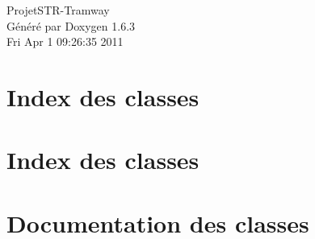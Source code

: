 \documentclass[a4paper]{book}
\begin{document}
\hypersetup{pageanchor=false}
\begin{titlepage}
\vspace*{7cm}
\begin{center}
{\Large ProjetSTR-\/Tramway }\\
\vspace*{1cm}
{\large Généré par Doxygen 1.6.3}\\
\vspace*{0.5cm}
{\small Fri Apr 1 09:26:35 2011}\\
\end{center}
\end{titlepage}
\clearemptydoublepage
{}
\tableofcontents
\clearemptydoublepage
{}
\hypersetup{pageanchor=true}
\chapter{Index des classes}

\chapter{Index des classes}

\chapter{Documentation des classes}













\printindex
\end{document}
